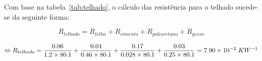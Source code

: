 \documentclass[12pt, a4paper]{article}
\begin{document}
Com base na tabela~\ref*{tab:telhado}, o cálculo das resistência para o telhado sucede-se da seguinte forma:

\begin{equation}
	R_{telhado} = R_{telha} + R_{cimento} + R_{poliuretano} + R_{gesso}
	\label{eq:telhado1}
\end{equation}

\begin{equation}
	\Leftrightarrow R_{telhado} =
	\dfrac{0.06}{1.2 \times 80.1} +
	\dfrac{0.04}{0.46 \times 80.1} +
	\dfrac{0.17}{0.028 \times 80.1} +
	\dfrac{0.03}{0.25 \times 80.1} = 7.90 \times 10^{-2} \hspace{1mm} KW^{-1}
	\label{eq:telhado2}
\end{equation}




\printbibliography{}
\end{document}
